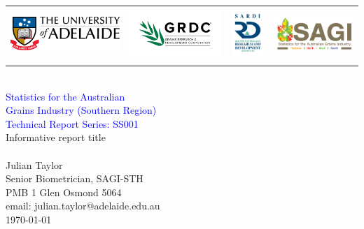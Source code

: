 \documentclass[oneside,12pt]{book}
\begin{document}
\frontmatter


\thispagestyle{empty}
\vspace*{25mm}
\begin{flushright}
\HRule\\[5mm]


\begin{tabular}{rrrr}
\includegraphics[height = 1.5cm]{UoA}  &
\includegraphics[height = 2.0cm]{GRDC} &
\includegraphics[height = 2.0cm]{SARDI} &
\includegraphics[height = 1.5cm]{SAGI-STH}
\end{tabular}\\[5mm]

\huge
\textcolor{blue}{\sbf Statistics for the Australian\\
Grains Industry (Southern Region)\\ Technical Report Series: SS001} \\[6mm]

{\sbf Informative report title}\\
\Large
\vspace{2mm}{\sbf Report for UA000001}\\[5mm]

\sf\normalsize
Julian Taylor\\
Senior Biometrician, SAGI-STH\\
PMB 1 Glen Osmond 5064\\
email: julian.taylor@adelaide.edu.au\\[8mm]

\today\\
\HRule
\end{flushright}
\end{document}
